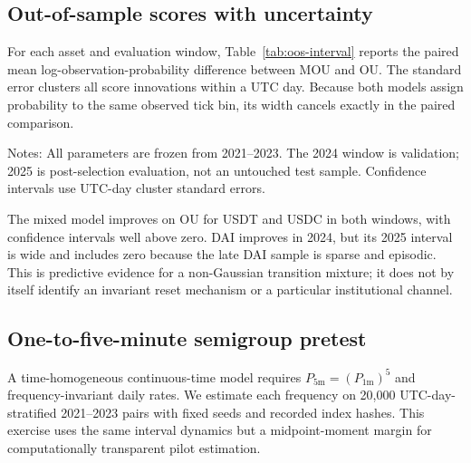 \subsection{Out-of-sample scores with uncertainty}

For each asset and evaluation window, Table~\ref{tab:oos-interval} reports the
paired mean log-observation-probability difference between MOU and OU.  The
standard error clusters all score innovations within a UTC day.  Because both
models assign probability to the same observed tick bin, its width cancels
exactly in the paired comparison.

\begin{table}[t]
\centering
\caption{Frozen-training MOU minus OU interval-score differences}
\label{tab:oos-interval}

\begin{minipage}{0.94\textwidth}
\footnotesize
Notes: All parameters are frozen from 2021--2023.  The 2024 window is
validation; 2025 is post-selection evaluation, not an untouched test sample.
Confidence intervals use UTC-day cluster standard errors.
\end{minipage}
\end{table}

The mixed model improves on OU for USDT and USDC in both windows, with
confidence intervals well above zero.  DAI improves in 2024, but its 2025
interval is wide and includes zero because the late DAI sample is sparse and
episodic.  This is predictive evidence for a non-Gaussian transition mixture;
it does not by itself identify an invariant reset mechanism or a particular
institutional channel.

\subsection{One-to-five-minute semigroup pretest}

A time-homogeneous continuous-time model requires
$P_{5\mathrm m}=(P_{1\mathrm m})^5$ and frequency-invariant daily rates.
We estimate each frequency on 20,000 UTC-day-stratified 2021--2023 pairs with
fixed seeds and recorded index hashes.  This exercise uses the same interval
dynamics but a midpoint-moment margin for computationally transparent pilot
estimation.

\begin{table}[t]
\centering
\caption{Interval-model parameters by sampling frequency}
\label{tab:frequency-parameters}

\end{table}

